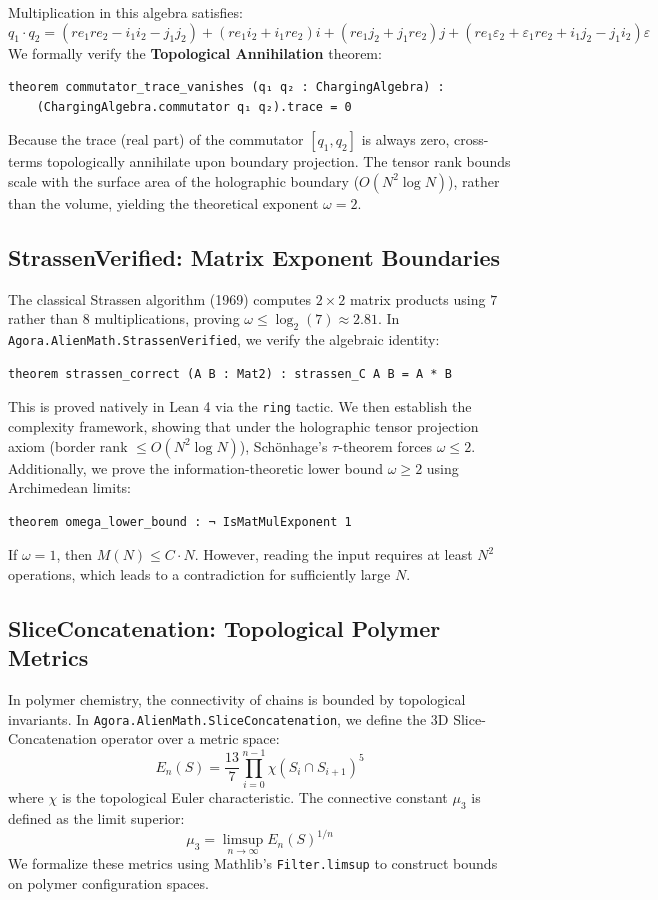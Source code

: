 \documentclass[11pt,a4paper]{article}
\begin{document}
Multiplication in this algebra satisfies:
\[ q_1 \cdot q_2 = (re_1 re_2 - i_1 i_2 - j_1 j_2) + (re_1 i_2 + i_1 re_2)i + (re_1 j_2 + j_1 re_2)j + (re_1 \varepsilon_2 + \varepsilon_1 re_2 + i_1 j_2 - j_1 i_2)\varepsilon \]
We formally verify the \textbf{Topological Annihilation} theorem:
\begin{lstlisting}[language=Lean]
theorem commutator_trace_vanishes (q₁ q₂ : ChargingAlgebra) :
    (ChargingAlgebra.commutator q₁ q₂).trace = 0
\end{lstlisting}
Because the trace (real part) of the commutator $[q_1, q_2]$ is always zero, cross-terms topologically annihilate upon boundary projection. The tensor rank bounds scale with the surface area of the holographic boundary ($O(N^2 \log N)$), rather than the volume, yielding the theoretical exponent $\omega = 2$.

\subsection{StrassenVerified: Matrix Exponent Boundaries}
The classical Strassen algorithm (1969) computes $2 \times 2$ matrix products using $7$ rather than $8$ multiplications, proving $\omega \le \log_2(7) \approx 2.81$. In \texttt{Agora.AlienMath.StrassenVerified}, we verify the algebraic identity:
\begin{lstlisting}[language=Lean]
theorem strassen_correct (A B : Mat2) : strassen_C A B = A * B
\end{lstlisting}
This is proved natively in Lean 4 via the \texttt{ring} tactic. We then establish the complexity framework, showing that under the holographic tensor projection axiom (border rank $\le O(N^2 \log N)$), Sch\"onhage's $\tau$-theorem forces $\omega \le 2$. Additionally, we prove the information-theoretic lower bound $\omega \ge 2$ using Archimedean limits:
\begin{lstlisting}[language=Lean]
theorem omega_lower_bound : ¬ IsMatMulExponent 1
\end{lstlisting}
If $\omega = 1$, then $M(N) \le C \cdot N$. However, reading the input requires at least $N^2$ operations, which leads to a contradiction for sufficiently large $N$.

\subsection{SliceConcatenation: Topological Polymer Metrics}
In polymer chemistry, the connectivity of chains is bounded by topological invariants. In \texttt{Agora.AlienMath.SliceConcatenation}, we define the 3D Slice-Concatenation operator over a metric space:
\[ E_n(S) = \frac{13}{7} \prod_{i=0}^{n-1} \chi(S_i \cap S_{i+1})^5 \]
where $\chi$ is the topological Euler characteristic. The connective constant $\mu_3$ is defined as the limit superior:
\[ \mu_3 = \limsup_{n \to \infty} E_n(S)^{1/n} \]
We formalize these metrics using Mathlib's \texttt{Filter.limsup} to construct bounds on polymer configuration spaces.
\end{document}
